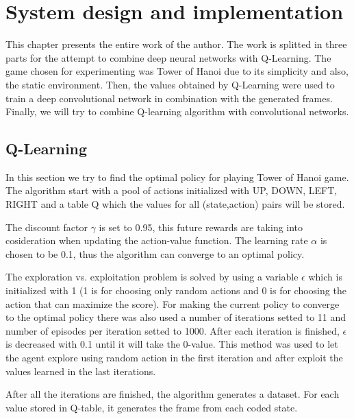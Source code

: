\chapter{System design and implementation}
\label{chapter:system-design}

This chapter presents the entire work of the author. The work is splitted in three parts for the attempt to combine deep neural networks with Q-Learning. The game chosen for experimenting was Tower of Hanoi due to its simplicity and also, the static environment. Then, the values obtained by Q-Learning were used to train a deep convolutional network in combination with the generated frames. Finally, we will try to combine Q-learning algorithm with convolutional networks.



\section{Q-Learning}
\label{sec:ql}
In this section we try to find the optimal policy for playing Tower of Hanoi game. The algorithm start with a pool of actions initialized with {UP, DOWN, LEFT, RIGHT} and a table Q which the values for all (state,action) pairs will be stored. 

The discount factor $\gamma$ is set to 0.95, this future rewards are taking into cosideration when updating the action-value function. The learning rate $\alpha$ is chosen to be 0.1, thus the algorithm can converge to an optimal policy. 

The exploration vs. exploitation problem is solved by using a variable $\epsilon$ which is initialized with 1 (1 is for choosing only random actions and 0 is for choosing the action that can maximize the score). For making the current policy to converge to the optimal policy there was also used a number of iterations setted to 11 and number of episodes per iteration setted to 1000. After each iteration is finished, $\epsilon$ is decreased with 0.1 until it will take the 0-value. This method was used to let the agent explore using random action in the first iteration and after exploit the values learned in the last iterations.

After all the iterations are finished, the algorithm generates a dataset. For each value stored in Q-table, it generates the frame from each coded state.

